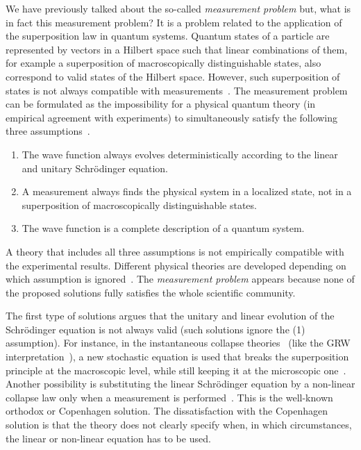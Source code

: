 \documentclass[nofootinbib, secnumarabic, amsmath, nobibnotes,10pt,aps,pra]{revtex4-1}
\begin{document}
We have previously talked about the so-called \emph{measurement problem}\cite{om.Dieter,om.maudlin,om.bohm66} but, what is in fact this measurement problem? It is a problem related to the application of the superposition law in quantum systems. Quantum states of a particle are represented by vectors in a Hilbert space such that linear combinations of them, for example a superposition of macroscopically distinguishable states, also correspond to valid states of the Hilbert space.
However, such superposition of states is not always compatible with measurements~\cite{om.bohm66,om.nikolic}. The measurement problem can be formulated as the impossibility for a physical quantum theory (in empirical agreement with experiments) to simultaneously satisfy the following three assumptions~\cite{om.maudlin}.
\begin{enumerate}
\item The wave function always evolves deterministically according to the linear and unitary Schr\"odinger equation.
\item A measurement always finds the physical system in a localized state, not in a superposition of macroscopically distinguishable states.
\item The wave function is a complete description of a quantum system.
\end{enumerate}
A theory that includes all three assumptions is not empirically compatible with the experimental results. Different physical theories are developed depending on which assumption is ignored~\cite{om.herbert}. The \emph{measurement problem} appears because none of the proposed solutions fully satisfies the whole scientific community.  

The first type of solutions argues that the unitary and linear evolution of the Schr\"odinger equation is not always valid (such solutions ignore the (1) assumption).
For instance, in the instantaneous collapse theories~\cite{om.bassi13} (like the GRW interpretation~\cite{om.ghirardi86}), a new stochastic equation is used 
that breaks the superposition principle at the macroscopic level, while still keeping it at the microscopic one~\cite{om.bassi13}.
Another possibility is substituting the linear Schr\"odinger equation by a non-linear collapse law only when a measurement is performed~\cite{om.bohr20}.
This is the well-known orthodox or Copenhagen solution. The dissatisfaction with the Copenhagen solution is that the theory does not clearly specify when, in which circumstances, the linear or non-linear equation has to be used. 
\end{document}
